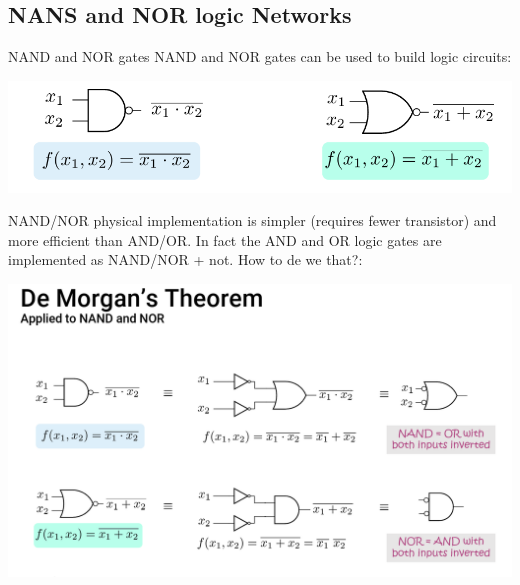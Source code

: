 \subsection{NANS and NOR logic Networks}
\begin{parag}{NAND and NOR gates}
    NAND and NOR gates can be used to build logic circuits:
    \begin{center}
        \includegraphics[scale=0.7]{NANDNOR2025-03-10.png}
    \end{center}
        NAND/NOR physical implementation is simpler (requires fewer transistor) and more efficient than AND/OR. In fact the AND and OR logic gates are implemented as NAND/NOR + not. How to de we that?:
        \begin{center}
            \includegraphics[scale=0.4]{morgantheoremgate2025-03-10.png}
        \end{center}

\end{parag}
